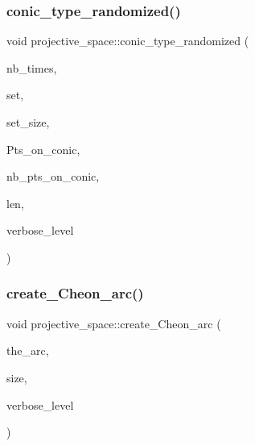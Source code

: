 \subsubsection{\texorpdfstring{conic\+\_\+type\+\_\+randomized()}{conic\_type\_randomized()}}
{\footnotesize\ttfamily void projective\+\_\+space\+::conic\+\_\+type\+\_\+randomized (\begin{DoxyParamCaption}\item[{\mbox{\hyperlink{galois_8h_a09fddde158a3a20bd2dcadb609de11dc}{I\+NT}}}]{nb\+\_\+times,  }\item[{\mbox{\hyperlink{galois_8h_a09fddde158a3a20bd2dcadb609de11dc}{I\+NT}} $\ast$}]{set,  }\item[{\mbox{\hyperlink{galois_8h_a09fddde158a3a20bd2dcadb609de11dc}{I\+NT}}}]{set\+\_\+size,  }\item[{\mbox{\hyperlink{galois_8h_a09fddde158a3a20bd2dcadb609de11dc}{I\+NT}} $\ast$$\ast$\&}]{Pts\+\_\+on\+\_\+conic,  }\item[{\mbox{\hyperlink{galois_8h_a09fddde158a3a20bd2dcadb609de11dc}{I\+NT}} $\ast$\&}]{nb\+\_\+pts\+\_\+on\+\_\+conic,  }\item[{\mbox{\hyperlink{galois_8h_a09fddde158a3a20bd2dcadb609de11dc}{I\+NT}} \&}]{len,  }\item[{\mbox{\hyperlink{galois_8h_a09fddde158a3a20bd2dcadb609de11dc}{I\+NT}}}]{verbose\+\_\+level }\end{DoxyParamCaption})}

\mbox{\label{classprojective__space_a9ffb7668f46e1a8ef0f11c65520cf615}} 
\subsubsection{\texorpdfstring{create\+\_\+\+Cheon\+\_\+arc()}{create\_Cheon\_arc()}}
{\footnotesize\ttfamily void projective\+\_\+space\+::create\+\_\+\+Cheon\+\_\+arc (\begin{DoxyParamCaption}\item[{\mbox{\hyperlink{galois_8h_a09fddde158a3a20bd2dcadb609de11dc}{I\+NT}} $\ast$}]{the\+\_\+arc,  }\item[{\mbox{\hyperlink{galois_8h_a09fddde158a3a20bd2dcadb609de11dc}{I\+NT}} \&}]{size,  }\item[{\mbox{\hyperlink{galois_8h_a09fddde158a3a20bd2dcadb609de11dc}{I\+NT}}}]{verbose\+\_\+level }\end{DoxyParamCaption})}

